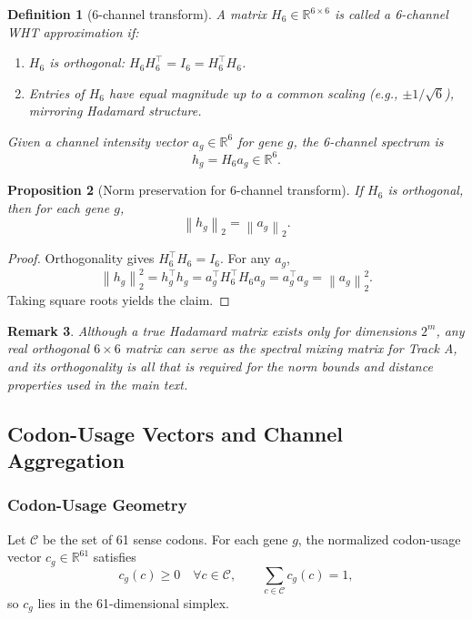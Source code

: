 \documentclass[11pt]{article}
\newtheorem{definition}{Definition}[section]
\newtheorem{proposition}[definition]{Proposition}
\newtheorem{remark}[definition]{Remark}
\newcommand{\R}{\mathbb{R}}
\newcommand{\norm}[1]{\left\lVert #1 \right\rVert}
\begin{document}
\begin{definition}[6-channel transform]
A matrix \(H_6 \in \R^{6 \times 6}\) is called a \emph{6-channel WHT approximation} if:
\begin{enumerate}
  \item \(H_6\) is orthogonal: \(H_6 H_6^\top = I_6 = H_6^\top H_6\).
  \item Entries of \(H_6\) have equal magnitude up to a common scaling (e.g., \(\pm 1/\sqrt{6}\)), mirroring Hadamard structure.
\end{enumerate}
Given a channel intensity vector \(a_g \in \R^6\) for gene \(g\), the 6-channel spectrum is
\[
  h_g = H_6 a_g \in \R^6.
\]
\end{definition}

\begin{proposition}[Norm preservation for 6-channel transform]
If \(H_6\) is orthogonal, then for each gene \(g\),
\[
  \norm{h_g}_2 = \norm{a_g}_2.
\]
\end{proposition}

\begin{proof}
Orthogonality gives \(H_6^\top H_6 = I_6\). For any \(a_g\),
\[
  \norm{h_g}_2^2 = h_g^\top h_g = a_g^\top H_6^\top H_6 a_g = a_g^\top a_g = \norm{a_g}_2^2.
\]
Taking square roots yields the claim.
\end{proof}

\begin{remark}
Although a true Hadamard matrix exists only for dimensions \(2^m\), any real orthogonal \(6 \times 6\) matrix can serve as the spectral mixing matrix for Track A, and its orthogonality is all that is required for the norm bounds and distance properties used in the main text.\cite{HadamardOverview,HadamardOrthonormal}
\end{remark}

\subsection{Codon-Usage Vectors and Channel Aggregation}

\subsubsection{Codon-Usage Geometry}

Let \(\mathcal{C}\) be the set of 61 sense codons. For each gene \(g\),
the normalized codon-usage vector \(c_g \in \R^{61}\) satisfies
\[
  c_g(c) \ge 0 \quad \forall c \in \mathcal{C},
  \qquad \sum_{c \in \mathcal{C}} c_g(c) = 1,
\]
so \(c_g\) lies in the 61-dimensional simplex.
\end{document}
